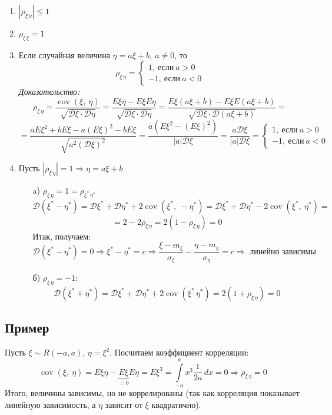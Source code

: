 \documentclass[12pt, a4paper]{article}
\begin{document}
    \begin{enumerate}
        \item $|\rho_{\xi\, \eta}| \leq 1$
        \item $\rho_{\xi\, \xi} = 1$
        \item Если случайная величина $\eta = a\xi + b,\ a\neq 0$, то
        \[\rho_{\xi\, \eta} = \begin{cases}
            1,\ \text{если}\ a > 0\\
            -1,\ \text{если}\ a < 0
        \end{cases}\]
        \textit{Доказательство:}
        \[\rho_{\xi\, \eta} = \frac{\operatorname{cov}(\xi,\ \eta)}{\sqrt{\mathcal{D}\xi\cdot \mathcal{D}\eta}} = \frac{E\xi\eta - E\xi E\eta}{\sqrt{\mathcal{D}\xi\cdot \mathcal{D}\eta}} = \frac{E\xi(a\xi + b) - E\xi E(a\xi + b)}{\sqrt{\mathcal{D}\xi\cdot \mathcal{D}(a\xi + b)}} =\]
        \[=\frac{aE\xi^2 + bE\xi - a(E\xi)^2 - bE\xi}{\sqrt{a^2(\mathcal{D}\xi)^2}} = \frac{a(E\xi^2 - (E\xi)^2)}{|a|\mathcal{D}\xi} = \frac{a\mathcal{D}\xi}{|a|\mathcal{D}\xi} = \begin{cases}
            1,\ \text{если}\ a > 0\\
            -1,\ \text{если}\ a < 0
        \end{cases}\]
        \item Пусть $|\rho_{\xi\, \eta}| = 1\Rightarrow \eta = a\xi + b$
        \begin{enumerate}
            \item[a)] $\rho_{\xi\, \eta} = 1 = \rho_{\xi^*\, \eta^*}$\\
            \[\mathcal{D}(\xi^* - \eta^*) = \mathcal{D}\xi^* + \mathcal{D}\eta^* + 2\operatorname{cov}(\xi^*,\ -\eta^*) = \mathcal{D}\xi^* + \mathcal{D}\eta^* - 2\operatorname{cov}(\xi^*,\ \eta^*) =\]
            \[= 2 - 2\rho_{\xi\, \eta} = 2(1 - \rho_{\xi\, \eta}) = 0\]
            Итак, получаем:
            \[\mathcal{D}(\xi^* - \eta^*) = 0 \Rightarrow \xi^* - \eta^* = c\Rightarrow \frac{\xi - m_{\xi}}{\sigma_{\xi}} - \frac{\eta - m_{\eta}}{\sigma_{\eta}} = c\Rightarrow \text{ линейно зависимы}\]
            \item[б)] $\rho_{\xi\, \eta} = -1$:
            \[\mathcal{D}(\xi^* + \eta^*) = \mathcal{D}\xi^* + \mathcal{D}\eta^* + 2\operatorname{cov}(\xi^*\, \eta^*) = 2(1 + \rho_{\xi\, \eta}) = 0\]
        \end{enumerate}
    \end{enumerate}
    \subsection*{Пример}
    Пусть $\xi \sim R(-a, a)$, $\eta = \xi^2$. Посчитаем коэффициент корреляции:
    \[\operatorname{cov}(\xi,\ \eta) = E\xi \eta - \underset{=0}{\underbrace{E\xi}} E\eta = E\xi^3 = \int\limits_{-a}^{a} x^3 \frac{1}{2a}\, dx = 0\Rightarrow \rho_{\xi\, \eta} = 0\]
    Итого, величины зависимы, но не коррелированы (так как корреляция показывает линейную зависимость, а $\eta$ зависит от $\xi$ квадратично).
\end{document}

